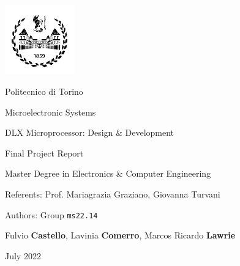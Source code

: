 \documentclass[10pt,english,makeidx,a4paper,titlepage,oneside]{book}
\begin{document}
\frontmatter
\begin{titlepage}
\vspace{0cm}
\centerline{
\includegraphics[width=3cm]{./logopolitonuovo}} 
\vspace{0.5cm}
\centerline{\LARGE Politecnico di Torino}
\vspace{2.5cm}
\centerline{\huge\sf Microelectronic Systems}
\vspace{1cm}
\centerline{\Huge\sf DLX Microprocessor: Design \& Development}
\bigskip
\centerline{\huge\sf Final Project Report}
\vspace{2cm}
\centerline{\Large Master Degree in Electronics \& Computer Engineering}
\vspace{4.5cm}

\centerline{\large Referents: Prof. Mariagrazia Graziano, Giovanna Turvani}
\bigskip
\vspace{1cm}

\centerline{\large Authors: Group \texttt{ms22.14}}
\bigskip

\centerline{\large Fulvio \textbf{Castello}, Lavinia \textbf{Comerro}, Marcos Ricardo \textbf{Lawrie}}

\vspace{2cm}
\centerline{\large July 2022}
\end{titlepage}

\tableofcontents
\listoffigures

\mainmatter





\end{document}
